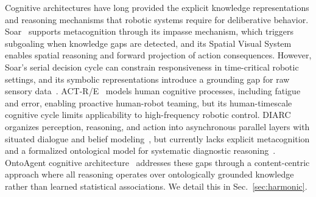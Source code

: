 \documentclass[letterpaper, 10 pt, conference]{ieeeconf}  %
\begin{document}
Cognitive architectures have long provided the 
explicit knowledge representations and reasoning 
mechanisms that robotic systems require for 
deliberative behavior. Soar~\cite{laird2012cognitive} supports metacognition through its impasse mechanism, which triggers subgoaling when knowledge gaps are detected, and its Spatial Visual System enables spatial reasoning and forward projection of action consequences. However, Soar's serial decision cycle can constrain responsiveness in time-critical robotic settings, and its symbolic representations introduce a grounding gap 
for raw sensory data~\cite{harnad1990symbol}. ACT-R/E~\cite{trafton2013actre} models human cognitive processes, including fatigue and error, enabling proactive human-robot teaming, but its human-timescale cognitive cycle limits applicability to high-frequency robotic control. DIARC~\cite{scheutz2013novel} organizes perception, reasoning, and action into asynchronous parallel layers with situated dialogue and belief modeling~\cite{scheutz2011humanlike}, but currently lacks explicit metacognition and a formalized 
ontological model for systematic diagnostic reasoning~\cite{english2020ontoagent-87e}. OntoAgent 
cognitive architecture~\cite{english2020ontoagent-87e, 
mcshane2024agents-172} addresses these gaps through a 
content-centric approach where all reasoning operates 
over ontologically grounded knowledge rather than 
learned statistical associations. We detail this in 
Sec.~\ref{sec:harmonic}.
\end{document}
